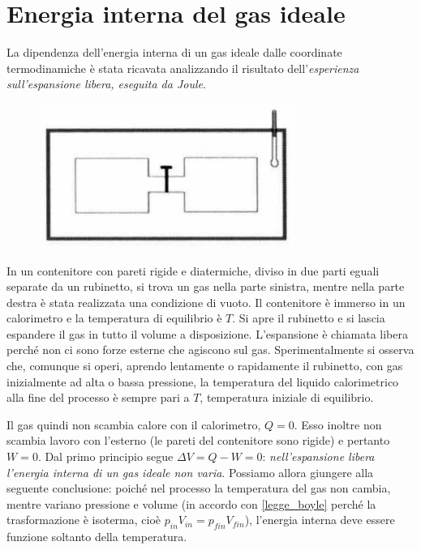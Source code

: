 \documentclass[class=book, crop=false, oneside, 12pt]{standalone}
\begin{document}
\section{Energia interna del gas ideale}

La dipendenza dell'energia interna di un gas ideale dalle coordinate termodinamiche è stata ricavata analizzando il risultato dell'\emph{esperienza sull'espansione libera, eseguita da Joule}. 

\begin{figure}[h]
    \includegraphics[scale=0.4]{espansione_libera.png}
    \centering
    \caption{}
\end{figure}

In un contenitore con pareti rigide e diatermiche, diviso in due parti eguali separate da un rubinetto, si trova un gas nella parte sinistra, mentre nella parte destra è stata realizzata una condizione di vuoto. 
Il contenitore è immerso in un calorimetro e la temperatura di equilibrio è \(T\). 
Si apre il rubinetto e si lascia espandere il gas in tutto il volume a disposizione. 
L'espansione è chiamata libera perché non ci sono forze esterne che agiscono sul gas.
Sperimentalmente si osserva che, comunque si operi, aprendo lentamente o rapidamente il rubinetto, con gas inizialmente ad alta o bassa pressione, la temperatura del liquido calorimetrico alla fine del processo è sempre pari a \(T\), temperatura iniziale di equilibrio.

Il gas quindi non scambia calore con il calorimetro, \(Q = 0\). 
Esso inoltre non scambia lavoro con l'esterno (le pareti del contenitore sono rigide) e pertanto \(W = 0\). 
Dal primo principio segue \(\Delta V = Q - W = 0\): \emph{nell'espansione libera l'energia interna di un gas ideale non varia}. 
Possiamo allora giungere alla seguente conclusione: poiché nel processo la temperatura del gas non cambia, mentre variano pressione e volume (in accordo con \ref{legge_boyle} perché la trasformazione è isoterma, cioè \(p_{in} V_{in} = p_{fin} V_{fin}\)), l'energia interna deve essere funzione soltanto della temperatura. 
\end{document}
